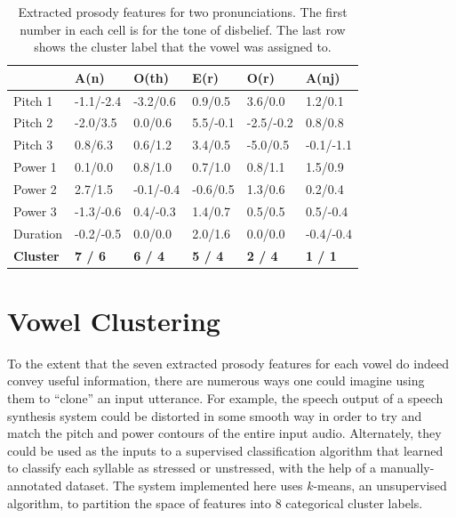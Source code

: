 \documentclass{article}
\begin{document}
\begin{table}[]
\centering
\begin{tabular}{|l|l|l|l|l|l|}
\hline
\textbf{}              & \textbf{A(n)}  & \textbf{O(th)} & \textbf{E(r)}  & \textbf{O(r)}  & \textbf{A(nj)} \\ \hline
Pitch 1                & -1.1/-2.4      & -3.2/0.6       & 0.9/0.5        & 3.6/0.0        & 1.2/0.1        \\ \hline
Pitch 2                & -2.0/3.5       & 0.0/0.6        & 5.5/-0.1       & -2.5/-0.2      & 0.8/0.8        \\ \hline
Pitch 3                & 0.8/6.3        & 0.6/1.2        & 3.4/0.5        & -5.0/0.5       & -0.1/-1.1      \\ \hline
Power 1                & 0.1/0.0        & 0.8/1.0        & 0.7/1.0        & 0.8/1.1        & 1.5/0.9        \\ \hline
Power 2                & 2.7/1.5        & -0.1/-0.4      & -0.6/0.5       & 1.3/0.6        & 0.2/0.4        \\ \hline
Power 3                & -1.3/-0.6      & 0.4/-0.3       & 1.4/0.7        & 0.5/0.5        & 0.5/-0.4       \\ \hline
Duration               & -0.2/-0.5      & 0.0/0.0        & 2.0/1.6        & 0.0/0.0        & -0.4/-0.4      \\ \hline
\textbf{Cluster} & \textbf{7 / 6} & \textbf{6 / 4} & \textbf{5 / 4} & \textbf{2 / 4} & \textbf{1 / 1} \\ \hline
\end{tabular}
\caption{Extracted prosody features for two pronunciations. The first number in each cell is for the tone of disbelief. The last row shows the cluster label that the vowel was assigned to.}
\label{table:pitchpow1}
\end{table}

\section{Vowel Clustering}
\label{sec:vowels}

To the extent that the seven extracted prosody features for each vowel do indeed convey useful information, there are numerous ways one could imagine using them to ``clone'' an input utterance.
For example, the speech output of a speech synthesis system could be distorted in some smooth way in order to try and match the pitch and power contours of the entire input audio.
Alternately, they could be used as the inputs to a supervised classification algorithm that learned to classify each syllable as stressed or unstressed, with the help of a manually-annotated dataset.
The system implemented here uses $k$-means, an unsupervised algorithm, to partition the space of features into 8 categorical cluster labels.
\end{document}
